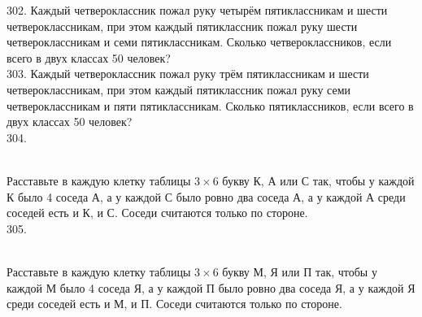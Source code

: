 \documentclass[12pt]{article}
\begin{document}
302. Каждый четвероклассник пожал руку четырём пятиклассникам и шести четвероклассникам, при этом каждый пятиклассник пожал руку шести четвероклассникам и семи пятиклассникам. Сколько четвероклассников, если всего в двух классах 50 человек?\\
303. Каждый четвероклассник пожал руку трём пятиклассникам и шести четвероклассникам, при этом каждый пятиклассник пожал руку семи четвероклассникам и пяти пятиклассникам. Сколько пятиклассников, если всего в двух классах 50 человек?\\
304. \begin{figure}[ht!]
\end{figure}\\
Расставьте в каждую клетку таблицы $3\times6$ букву К, А или С так, чтобы у каждой К было 4 соседа А, а у каждой С было ровно два соседа А, а у каждой А среди соседей есть и К, и С. Соседи считаются только по стороне.\\
305. \begin{figure}[ht!]
\end{figure}\\
Расставьте в каждую клетку таблицы $3\times6$ букву М, Я или П так, чтобы у каждой М было 4 соседа Я, а у каждой П было ровно два соседа Я, а у каждой Я среди соседей есть и М, и П. Соседи считаются только по стороне.\\
\end{document}
